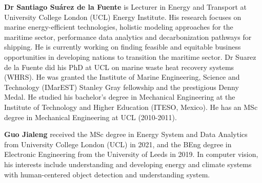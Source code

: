 \documentclass[lettersize,journal]{IEEEtran}
\begin{document}
\vspace{11pt}
\textbf{Dr Santiago Suárez de la Fuente} is Lecturer in Energy and Transport at University College London (UCL) Energy Institute. His research focuses on marine energy-efficient technologies, holistic modeling approaches for the maritime sector, performance data analytics and decarbonization pathways for shipping. He is currently working on finding feasible and equitable business opportunities in developing nations to transition the maritime sector. Dr Suarez de la Fuente did his PhD at UCL on marine waste heat recovery systems (WHRS). He was granted the Institute of Marine Engineering, Science and Technology (IMarEST) Stanley Gray fellowship and the prestigious Denny Medal. He studied his bachelor’s degree in Mechanical Engineering at the Institute of Technology and Higher Education (ITESO, Mexico). He has an MSc degree in Mechanical Engineering at UCL (2010-2011).

\textbf{Guo Jialeng} received the MSc degree in Energy System and Data Analytics from University College London (UCL) in 2021, and the BEng degree in Electronic Engineering from the University of Leeds in 2019. In computer vision, his interests include understanding and developing energy and climate systems with human-centered object detection and understanding system.






\vfill
\end{document}
